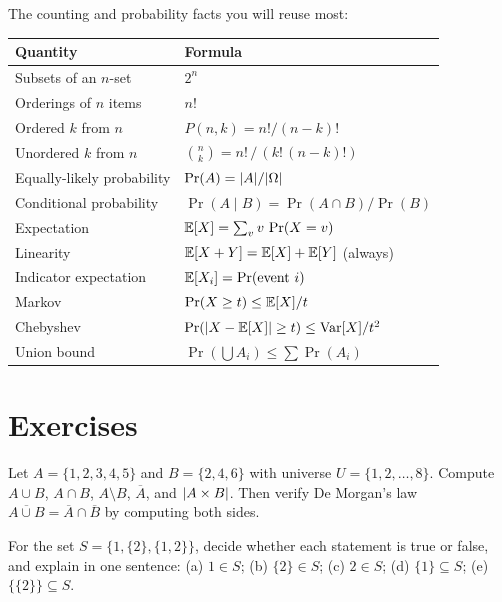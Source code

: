 \begin{complexitybox}
The counting and probability facts you will reuse most:
\begin{center}
\begin{tabular}{@{}ll@{}}
\toprule
\textbf{Quantity} & \textbf{Formula} \\
\midrule
Subsets of an $n$-set & $2^n$ \\
Orderings of $n$ items & $n!$ \\
Ordered $k$ from $n$ & $P(n,k) = n!/(n-k)!$ \\
Unordered $k$ from $n$ & $\binom{n}{k} = n!\,/\,(k!\,(n-k)!)$ \\
Equally-likely probability & $\Pr(A) = \lvert A\rvert/\lvert\Omega\rvert$ \\
Conditional probability & $\Pr(A\mid B) = \Pr(A\cap B)/\Pr(B)$ \\
Expectation & $\mathbb{E}[X] = \sum_v v\,\Pr(X=v)$ \\
Linearity & $\mathbb{E}[X+Y] = \mathbb{E}[X] + \mathbb{E}[Y]$ (always) \\
Indicator expectation & $\mathbb{E}[X_i] = \Pr(\text{event } i)$ \\
Markov & $\Pr(X \ge t) \le \mathbb{E}[X]/t$ \\
Chebyshev & $\Pr(\lvert X-\mathbb{E}[X]\rvert\ge t) \le \operatorname{Var}[X]/t^2$ \\
Union bound & $\Pr(\bigcup A_i) \le \sum \Pr(A_i)$ \\
\bottomrule
\end{tabular}
\end{center}
\end{complexitybox}

\section*{Exercises}
\label{ch38:exercises}

\begin{exercise}
Let $A = \{1,2,3,4,5\}$ and $B = \{2,4,6\}$ with universe $U = \{1,2,\dots,8\}$.
Compute $A \cup B$, $A \cap B$, $A \setminus B$, $\overline{A}$, and $\lvert A \times
B\rvert$. Then verify De Morgan's law $\overline{A \cup B} = \overline{A} \cap \overline{B}$
by computing both sides.
\end{exercise}

\begin{exercise}
For the set $S = \{1, \{2\}, \{1,2\}\}$, decide whether each statement is true or
false, and explain in one sentence: (a) $1 \in S$; (b) $\{2\} \in S$; (c)
$2 \in S$; (d) $\{1\} \subseteq S$; (e) $\{\{2\}\} \subseteq S$.
\end{exercise}

